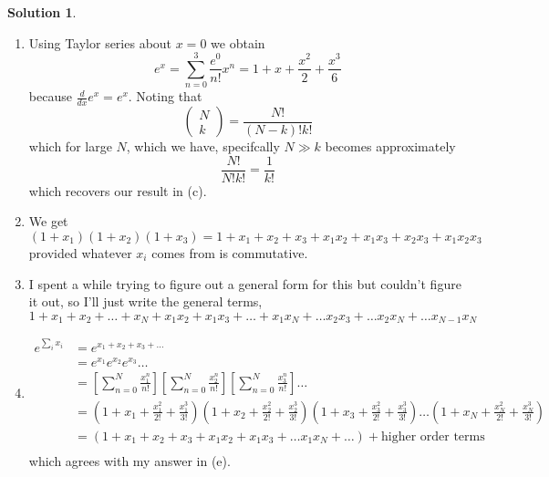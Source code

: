 \documentclass[10pt]{article}
\theoremstyle{definition}
\newtheorem{soln}{Solution}
\begin{document}
\begin{soln}
\begin{enumerate}[label=(\alph*)]
$$\begin{pmatrix}
              N \\
              3
            \end{pmatrix}\frac{x^3}{N^3}
          $$
    \item Using Taylor series about $x=0$ we obtain
          $$e^x=\sum_{n=0}^3\frac{e^0}{n!}x^n=1+x+\frac{x^2}{2}+\frac{x^3}{6}$$
          because $\frac{d}{dx}e^x=e^x$. Noting that
          $$\begin{pmatrix}
              N \\
              k
            \end{pmatrix}=\frac{N!}{(N-k)!k!}$$
          which for large $N$, which we have, specifcally $N\gg k$ becomes approximately
          $$\frac{N!}{N!k!}=\frac{1}{k!}$$ which recovers our result in (c).
    \item We get
          $$
            (1+x_1)(1+x_2)(1+x_3)=1+x_1+x_2+x_3+x_1x_2+x_1x_3+x_2x_3+x_1x_2x_3
          $$
          provided whatever $x_i$ comes from is commutative.
    \item I spent a while trying to figure out a general form for this but couldn't figure it out, so I'll just write the general terms,
          $$1+x_1+x_2+\dots+x_N+x_1x_2+x_1x_3+\dots+x_1x_N+\dots x_2x_3+\dots x_2x_N+\dots x_{N-1}x_N$$
    \item \begin{align*}
            e^{\sum_{i}x_i} & =e^{x_1+x_2+x_3+\dots}      \\
                            & =e^{x_1}e^{x_2}e^{x_3}\dots \\
                            & =\left[\sum_{n=0}^{N}\frac{x_1^n}{n!}\right]\left[\sum_{n=0}^{N}\frac{x_2^n}{n!}\right]\left[\sum_{n=0}^{N}\frac{x_3^n}{n!}\right]\dots \\
                            & =\left(1+x_1+\frac{x_1^2}{2!}+\frac{x_1^3}{3!}\right)\left(1+x_2+\frac{x_2^2}{2!}+\frac{x_2^3}{3!}\right)\left(1+x_3+\frac{x_3^2}{2!}+\frac{x_3^3}{3!}\right)\dots\left(1+x_N+\frac{x_N^2}{2!}+\frac{x_N^3}{3!}\right) \\
                            & =\left(1+x_1+x_2+x_3+x_1x_2+x_1x_3+\dots x_1x_N+\dots\right)+\text{higher order terms} \\
          \end{align*}
          which agrees with my answer in (e).
  \end{enumerate}
\end{soln}
\end{document}
